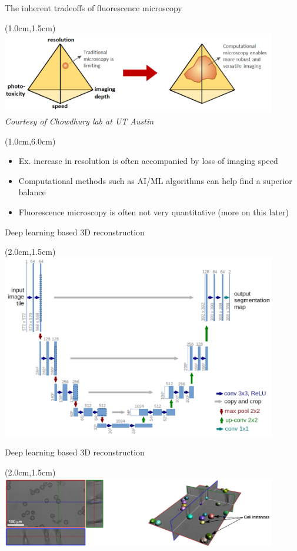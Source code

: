 \documentclass{beamer}					%
\begin{document}
\begin{frame}{The inherent tradeoffs of fluorescence microscopy}
\begin{textblock*}{12cm}(1.0cm,1.5cm)
\includegraphics[width=12cm]{../../postdoc/sartorius/media/Tradeoff.png}
\emph{Courtesy of Chowdhury lab at UT Austin}
\end{textblock*}
\begin{textblock*}{12cm}(1.0cm,6.0cm)
\begin{itemize}
\item Ex. increase in resolution is often accompanied by loss of imaging speed
\item Computational methods such as AI/ML algorithms can help find a superior balance
\item Fluorescence microscopy is often not very quantitative (more on this later)
\end{itemize}
\end{textblock*}
\end{frame}

\begin{frame}{Deep learning based 3D reconstruction}
\begin{textblock*}{12cm}(2.0cm,1.5cm)
\includegraphics[width=12cm]{../../postdoc/sartorius/media/Arch.png}
\end{textblock*}
\end{frame}


\begin{frame}{Deep learning based 3D reconstruction}
\begin{textblock*}{12cm}(2.0cm,1.5cm)
\includegraphics[width=12cm]{../../postdoc/sartorius/media/UNET-1.png}
\end{textblock*}
\end{frame}
\end{document}
